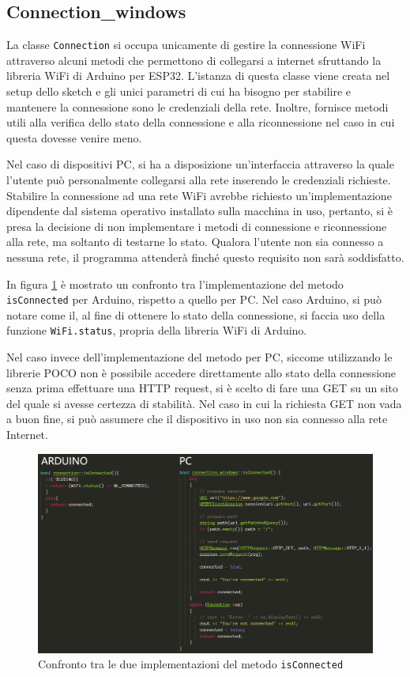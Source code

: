 \subsection{Connection\_windows}
La classe \texttt{Connection} si occupa unicamente di gestire la connessione WiFi attraverso alcuni metodi che permettono di collegarsi a internet sfruttando la libreria WiFi di Arduino per ESP32. L'istanza di questa classe viene creata nel setup dello sketch e gli unici parametri di cui ha bisogno per stabilire e mantenere la connessione sono le credenziali della rete. Inoltre, fornisce metodi utili alla verifica dello stato della connessione e alla riconnessione nel caso in cui questa dovesse venire meno.

Nel caso di dispositivi PC, si ha a disposizione un’interfaccia attraverso la quale l’utente può personalmente collegarsi alla rete inserendo le credenziali richieste. Stabilire la connessione ad una rete WiFi avrebbe richiesto un’implementazione dipendente dal sistema operativo installato sulla macchina in uso, pertanto, si è presa la decisione di non implementare i metodi di connessione e riconnessione alla rete, ma soltanto di testarne lo stato. Qualora l’utente non sia connesso a nessuna rete, il programma attenderà finché questo requisito non sarà soddisfatto.

In figura \ref{connAW} è mostrato un confronto tra l’implementazione del metodo \texttt{isConnected} per Arduino, rispetto a quello per PC. Nel caso Arduino, si può notare come il, al fine di ottenere lo stato della connessione, si faccia uso della funzione \texttt{WiFi.status}, propria della libreria WiFi di Arduino.

Nel caso invece dell'implementazione del metodo per PC, siccome utilizzando le librerie POCO non è possibile accedere direttamente allo stato della connessione senza prima effettuare una HTTP request, si è scelto di fare una GET su un sito del quale si avesse certezza di stabilità. Nel caso in cui la richiesta GET non vada a buon fine, si può assumere che il dispositivo in uso non sia connesso alla rete Internet.

\begin{figure}[H]
	\centering
	\includegraphics[width=\linewidth]{pics/connAW}
	\caption{Confronto tra le due implementazioni del metodo \texttt{isConnected}}
	\label{connAW}
\end{figure}


